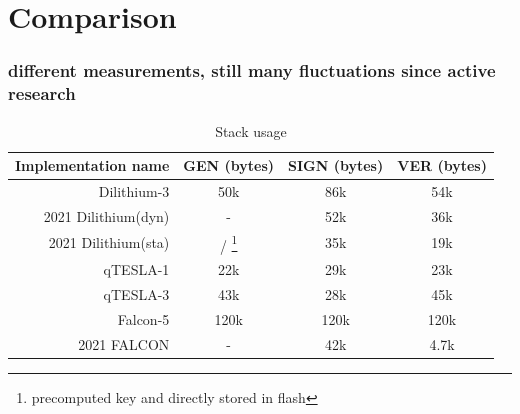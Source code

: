 \documentclass[ucs,10pt]{beamer}
\begin{document}
\section{Comparison}
\begin{frame}[allowframebreaks]
  \frametitle{different measurements, still many fluctuations since active research}

  \begin{table}%
    \caption{Stack usage}
    \label{t:stack_comp}
    \centering\begin{tabular}{| r | c c c |}
        \hline
        Implementation name                     & GEN (bytes) & SIGN (bytes) & VER (bytes)\\
        \hline
        Dilithium-3 \cite{QR_Iot_Lattice}       & 50k       & 86k   & 54k\\
        2021 Dilithium(dyn)\cite{update_sign}   & -         & 52k   & 36k\\
        2021 Dilithium(sta)\cite{update_sign}   & / \footnote{precomputed key and directly stored in flash} & 35k   & 19k\\ %
        qTESLA-1 \cite{QR_Iot_Lattice}          & 22k       & 29k   & 23k\\
        qTESLA-3 \cite{QR_Iot_Lattice}          & 43k       & 28k   & 45k\\
        Falcon-5  \cite{QR_Iot_Lattice}         & 120k      & 120k  & 120k\\
        2021 FALCON \cite{update_sign}          & -         & 42k   & 4.7k\\
        \hline
    \end{tabular}
\end{table}


\end{frame}
\end{document}
